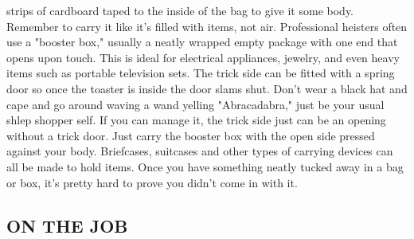 \documentclass[11pt,twoside,a4paper]{book}
\begin{document}
strips of cardboard taped to the inside of the bag to give it some body.~\\

Remember to carry it like it's filled with items, not air. Professional heisters often use a "booster box," usually a neatly wrapped empty package with one end that opens upon touch. This is ideal for electrical appliances, jewelry, and even heavy items such as portable television sets. The trick side can be fitted with a spring door so once the toaster is inside the door slams shut. Don't wear a black hat and cape and go around waving a wand yelling "Abracadabra," just be your usual shlep shopper self. If you can manage it, the trick side just can be an opening without a trick door. Just carry the booster box with the open side pressed against your body. Briefcases, suitcases and other types of carrying devices can all be made to hold items. Once you have something neatly tucked away in a bag or box, it's pretty hard to prove you didn't come in with it.

\subsection{ON THE JOB}
\end{document}
